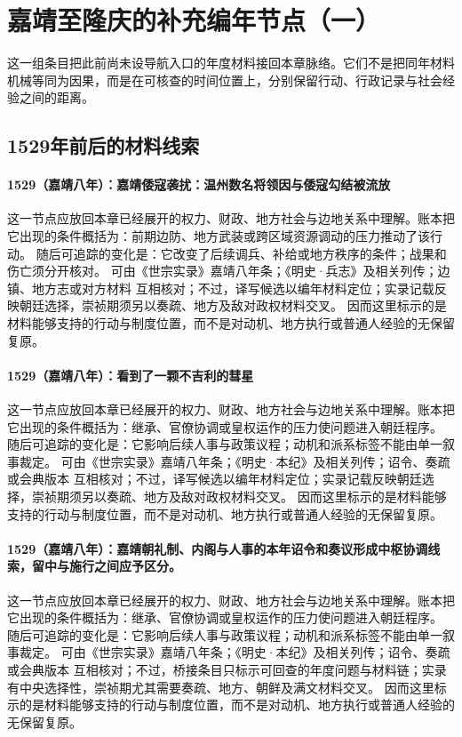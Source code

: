 \section{嘉靖至隆庆的补充编年节点（一）}
这一组条目把此前尚未设导航入口的年度材料接回本章脉络。它们不是把同年材料机械等同为因果，而是在可核查的时间位置上，分别保留行动、行政记录与社会经验之间的距离。

\subsection{1529年前后的材料线索}

\paragraph{1529（嘉靖八年）：嘉靖倭寇袭扰：温州数名将领因与倭寇勾结被流放} 这一节点应放回本章已经展开的权力、财政、地方社会与边地关系中理解。账本把它出现的条件概括为：前期边防、地方武装或跨区域资源调动的压力推动了该行动。 随后可追踪的变化是：它改变了后续调兵、补给或地方秩序的条件；战果和伤亡须分开核对。 可由《世宗实录》嘉靖八年条；《明史·兵志》及相关列传；边镇、地方志或对方材料 互相核对；不过，译写候选以编年材料定位；实录记载反映朝廷选择，崇祯期须另以奏疏、地方及敌对政权材料交叉。 因而这里标示的是材料能够支持的行动与制度位置，而不是对动机、地方执行或普通人经验的无保留复原。

\paragraph{1529（嘉靖八年）：看到了一颗不吉利的彗星} 这一节点应放回本章已经展开的权力、财政、地方社会与边地关系中理解。账本把它出现的条件概括为：继承、官僚协调或皇权运作的压力使问题进入朝廷程序。 随后可追踪的变化是：它影响后续人事与政策议程；动机和派系标签不能由单一叙事裁定。 可由《世宗实录》嘉靖八年条；《明史·本纪》及相关列传；诏令、奏疏或会典版本 互相核对；不过，译写候选以编年材料定位；实录记载反映朝廷选择，崇祯期须另以奏疏、地方及敌对政权材料交叉。 因而这里标示的是材料能够支持的行动与制度位置，而不是对动机、地方执行或普通人经验的无保留复原。

\paragraph{1529（嘉靖八年）：嘉靖朝礼制、内阁与人事的本年诏令和奏议形成中枢协调线索，留中与施行之间应予区分。} 这一节点应放回本章已经展开的权力、财政、地方社会与边地关系中理解。账本把它出现的条件概括为：继承、官僚协调或皇权运作的压力使问题进入朝廷程序。 随后可追踪的变化是：它影响后续人事与政策议程；动机和派系标签不能由单一叙事裁定。 可由《世宗实录》嘉靖八年条；《明史·本纪》及相关列传；诏令、奏疏或会典版本 互相核对；不过，桥接条目只标示可回查的年度问题与材料链；实录有中央选择性，崇祯期尤其需要奏疏、地方、朝鲜及满文材料交叉。 因而这里标示的是材料能够支持的行动与制度位置，而不是对动机、地方执行或普通人经验的无保留复原。

